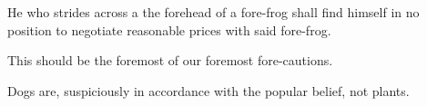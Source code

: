 He who strides across a the forehead of a fore-frog shall find
himself in no position to negotiate reasonable prices with 
said fore-frog.


This should be the foremost of our foremost fore-cautions.


Dogs are, suspiciously in accordance with the popular belief, not plants.


